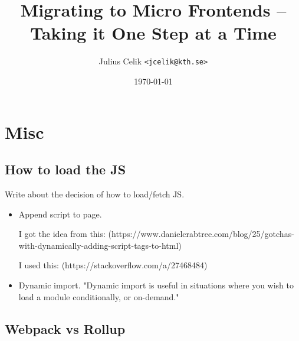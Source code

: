 \documentclass{report}
\title{Migrating to Micro Frontends -- Taking it One Step at a Time}
\author{Julius Celik \texttt{<jcelik@kth.se>}}
\date{\today}
\begin{document}
\maketitle







\chapter{Misc}

\section{How to load the JS}
Write about the decision of how to load/fetch JS.

\begin{itemize}
    \item Append script to page. 
    
    I got the idea from this: (https://www.danielcrabtree.com/blog/25/gotchas-with-dynamically-adding-script-tags-to-html)
    
    I used this: (https://stackoverflow.com/a/27468484)
    \item Dynamic import. "Dynamic import is useful in situations where you wish to load a module conditionally, or on-demand." \cite{MDNWebDocs2020}
\end{itemize}

\section{Webpack vs Rollup}

\printbibliography
\end{document}

